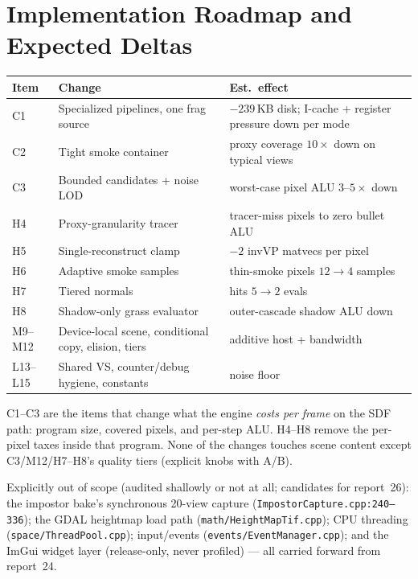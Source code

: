 \documentclass[11pt,a4paper]{article}
\begin{document}
\section{Implementation Roadmap and Expected Deltas}

\begin{table}[h]
\centering
\small
\begin{tabular}{@{}lp{5.8cm}p{5.6cm}@{}}
\toprule
\textbf{Item} & \textbf{Change} & \textbf{Est.\ effect} \\
\midrule
C1 & Specialized pipelines, one frag source & $-239$\,KB disk; I-cache + register pressure down per mode \\
C2 & Tight smoke container & proxy coverage $10\times$ down on typical views \\
C3 & Bounded candidates + noise LOD & worst-case pixel ALU $3$--$5\times$ down \\
H4 & Proxy-granularity tracer & tracer-miss pixels to zero bullet ALU \\
H5 & Single-reconstruct clamp & $-2$ invVP matvecs per pixel \\
H6 & Adaptive smoke samples & thin-smoke pixels $12 \rightarrow 4$ samples \\
H7 & Tiered normals & hits $5 \rightarrow 2$ evals \\
H8 & Shadow-only grass evaluator & outer-cascade shadow ALU down \\
M9--M12 & Device-local scene, conditional copy, elision, tiers & additive host + bandwidth \\
L13--L15 & Shared VS, counter/debug hygiene, constants & noise floor \\
\bottomrule
\end{tabular}
\end{table}

C1--C3 are the items that change what the engine \emph{costs per frame} on
the SDF path: program size, covered pixels, and per-step ALU. H4--H8 remove
the per-pixel taxes inside that program. None of the changes touches scene
content except C3/M12/H7--H8's quality tiers (explicit knobs with A/B).

Explicitly out of scope (audited shallowly or not at all; candidates for
report~26): the impostor bake's synchronous 20-view capture
(\texttt{ImpostorCapture.cpp:240--336}); the GDAL heightmap load path
(\texttt{math/HeightMapTif.cpp}); CPU threading
(\texttt{space/ThreadPool.cpp}); input/events
(\texttt{events/EventManager.cpp}); and the ImGui widget layer
(release-only, never profiled) --- all carried forward from report~24.
\end{document}
